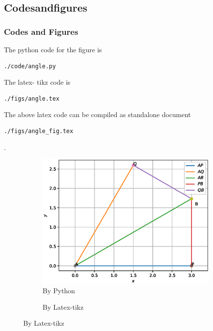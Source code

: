 \documentclass{beamer}
\begin{document}
\subsection*{Codesandfigures}
\begin{frame}[fragile]
\frametitle{Codes and Figures}
\tiny
\begin{flushleft}
The python code for the figure is
\begin{lstlisting}
./code/angle.py
\end{lstlisting}
The latex- tikz code is
\begin{lstlisting}
./figs/angle.tex
\end{lstlisting}
The above latex code can be compiled as standalone document
\begin{lstlisting} 
./figs/angle_fig.tex
\end{lstlisting}
\end{flushleft}.
\begin{figure}
\begin{minipage}{0.45\linewidth}
\begin{subfigure}{0.5\textwidth}

\begin{flushleft}

\includegraphics[scale=0.275]{./figs/angle.eps}
\caption{\tiny By Python}
\end{flushleft}

\end{subfigure}
\end{minipage}
\hfill
\begin{minipage}{0.45\linewidth}
\begin{subfigure}{0.4\textwidth}
\begin{flushright}

\resizebox{2.0\columnwidth}{!}{}
\caption{\tiny By Latex-tikz}
\end{flushright}
\end{subfigure}
\end{minipage}
\end{figure}
\end{frame}
\end{document}
